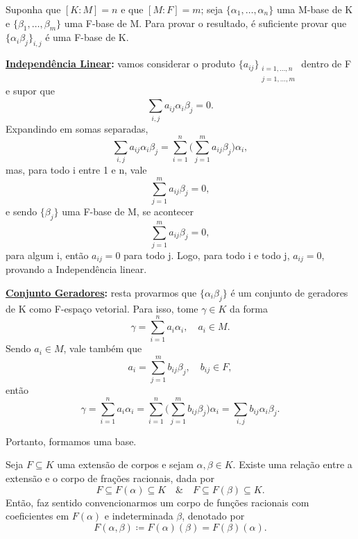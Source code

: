 \documentclass[../algebraIII_notes.tex]{subfiles}
\begin{document}
\begin{proof*}
	Suponha que \([K:M]=n\) e que \([M:F]=m\); seja \(\{\alpha_{1}, \dotsc , \alpha_{n}\}\) uma M-base de K e \(\{\beta_1, \dotsc , \beta_{m}\}\) uma F-base de M. Para provar o resultado, é suficiente provar que \(\{\alpha_{i}\beta_{j}\}_{i, j}\) é uma F-base de K.

	\textbf{\underline{Independência Linear}:} vamos considerar o produto \(\{a_{ij}\}_{\substack{i=1,\dotsc , n \\ j=1,\dotsc ,m}}\) dentro de F e supor que
	\[
		\sum\limits_{i, j}^{}a_{ij}\alpha_{i}\beta_{j} = 0.
	\]
	Expandindo em somas separadas,
	\[
		\sum\limits_{i, j}^{}a_{ij}\alpha_{i}\beta_{j}= \sum\limits_{i=1}^{n}\biggl(\sum\limits_{j=1}^{m}a_{ij}\beta_{j}\biggr)\alpha_{i},
	\]
	mas, para todo i entre 1 e n, vale
	\[
		\sum\limits_{j=1}^{m}a_{ij}\beta_{j}=0,
	\]
	e sendo \(\{\beta_{j}\}\) uma F-base de M, se acontecer
	\[
		\sum\limits_{j=1}^{m}a_{ij}\beta_{j}=0,
	\]
	para algum i, então \(a_{ij}=0\) para todo j. Logo, para todo i e todo j, \(a_{ij}=0\), provando a Independência linear.

	\textbf{\underline{Conjunto Geradores}:} resta provarmos que \(\{\alpha_{i}\beta_{j}\}\) é um conjunto de geradores de K como F-espaço vetorial. Para isso, tome \(\gamma \in K\) da forma
	\[
		\gamma = \sum\limits_{i=1}^{n}a_{i}\alpha_{i}, \quad a_{i}\in M.
	\]
	Sendo \(a_{i}\in M\), vale também que
	\[
		a_{i}=\sum\limits_{j=1}^{m}b_{ij}\beta_{j}, \quad b_{ij}\in F,
	\]
	então
	\[
		\gamma =\sum\limits_{i=1}^{n}a_{i}\alpha_{i}=\sum\limits_{i=1}^{n}\biggl(\sum\limits_{j=1}^{m}b_{ij}\beta_{j}\biggr)\alpha_{i} = \sum\limits_{i, j}^{}b_{ij}\alpha_{i}\beta_{j}.
	\]

	Portanto, formamos uma base. \qedsymbol
\end{proof*}
\begin{tcolorbox}[
		skin=enhanced,
		title=Observação,
		fonttitle=\bfseries,
		colframe=black,
		colbacktitle=cyan!75!white,
		colback=cyan!15,
		colbacklower=black,
		coltitle=black,
		drop fuzzy shadow,
	]
	Seja \(F\subseteq K\) uma extensão de corpos e sejam \( \alpha , \beta \in K\). Existe uma relação entre a extensão e o corpo de frações racionais, dada por
	\[
		F\subseteq F(\alpha ) \subseteq K \quad\&\quad F\subseteq F(\beta )\subseteq K.
	\]
	Então, faz sentido convencionarmos um corpo de funções racionais com coeficientes em \(F(\alpha )\) e indeterminada \(\beta \), denotado por
	\[
		F(\alpha , \beta )\coloneqq F(\alpha )(\beta )=F(\beta)(\alpha).
	\]
\end{tcolorbox}
\end{document}
